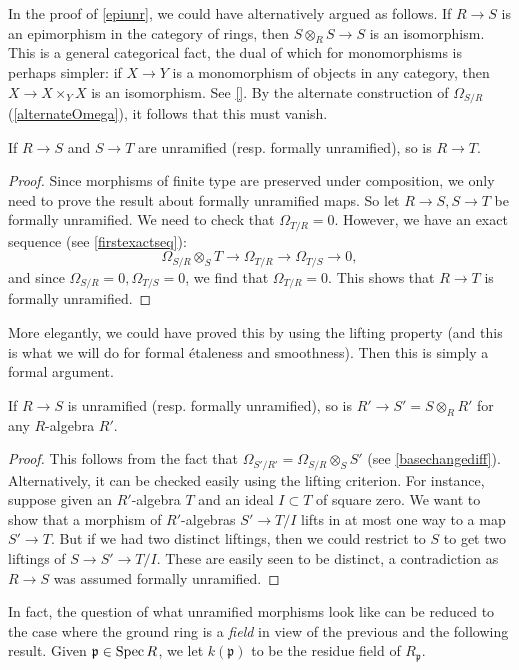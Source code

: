 In the proof of \cref{epiunr}, we could have alternatively argued as follows. If $R \to S$ is an epimorphism
in the category of rings, then $S \otimes_R S \to S$ is an isomorphism. 
This is a general categorical fact, the dual of which for monomorphisms is
perhaps simpler: if $X \to Y$ is a monomorphism of objects in any category,
then $X \to X \times_Y X$ is an isomorphism. See \cref{}. By the alternate
construction of $\Omega_{S/R}$ (\cref{alternateOmega}), it follows that this must vanish.


\begin{proposition} 
\label{sorite1unr}
If $R \to S$ and $S \to T$ are unramified (resp. formally unramified), so is $R \to T$.
\end{proposition} 
\begin{proof} 
Since morphisms of finite type are preserved under composition, we only need
to prove the result about formally unramified maps. So let $R \to S, S \to T$
be formally unramified. We need to check that
$\Omega_{T/R}  = 0$. However, we have an exact sequence (see
\cref{firstexactseq}):
\[ \Omega_{S/R}\otimes_S T \to \Omega_{T/R} \to \Omega_{T/S} \to 0,  \]
and since $\Omega_{S/R} = 0, \Omega_{T/S} = 0$, we find that $\Omega_{T/R}  =
0$. This shows that $R \to T$ is formally unramified.
\end{proof} 
More elegantly, we could have proved this by using the lifting property (and
this is what we will do for formal \'etaleness and smoothness).
Then this is simply a formal argument.

\begin{proposition}  \label{unrbasechange}
If $R \to S$ is unramified (resp. formally unramified), so is $R' \to S' = S \otimes_R R'$ for any $R$-algebra
$R'$.
\end{proposition} 
\begin{proof} 
This follows from the fact that $\Omega_{S'/R'} = \Omega_{S/R} \otimes_S S'$
(see \cref{basechangediff}).
Alternatively, it can be checked easily using the lifting criterion.
For instance, suppose given an $R'$-algebra $T$ and an ideal $I \subset T$ of
square zero. We want to show that a morphism of $R'$-algebras
$S' \to T/I$ lifts in at most one way to a map $S' \to T$. But if we had two
distinct liftings, then we could restrict to $S$ to get two liftings  of $S \to
S' \to T/I$. These are easily seen to be distinct, a contradiction as $R \to
S$ was assumed formally unramified. 
\end{proof} 


In fact, the question of what unramified morphisms look like can be reduced to
the case where the ground ring is a \emph{field} in view of the previous and
the following result.
Given $\mathfrak{p} \in \operatorname{Spec} R$, we let $k(\mathfrak{p})$ to be the residue
field of $R_{\mathfrak{p}}$.


